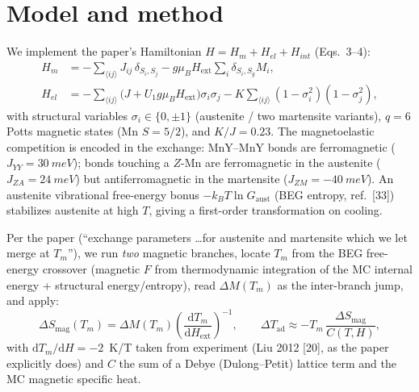 \documentclass[11pt]{article}
\begin{document}
\section{Model and method}
We implement the paper's Hamiltonian $H = H_m + H_{el} + H_{int}$ (Eqs.~3--4):
\begin{align}
H_m &= -\sum_{\langle ij\rangle} J_{ij}\,\delta_{S_i,S_j}
       - g\mu_B H_{\mathrm{ext}}\sum_i \delta_{S_i,S_g} M_i, \\
H_{el} &= -\sum_{\langle ij\rangle}\!\big(J + U_1 g\mu_B H_{\mathrm{ext}}\big)\sigma_i\sigma_j
          - K\!\sum_{\langle ij\rangle}(1-\sigma_i^2)(1-\sigma_j^2),
\end{align}
with structural variables $\sigma_i \in \{0,\pm1\}$ (austenite / two martensite
variants), $q{=}6$ Potts magnetic states (Mn $S{=}5/2$), and $K/J = 0.23$.
The magnetoelastic competition is encoded in the exchange: MnY--MnY bonds are
ferromagnetic ($J_{YY}=\SI{30}{meV}$); bonds touching a $Z$-Mn are ferromagnetic
in the austenite ($J_{ZA}=\SI{24}{meV}$) but antiferromagnetic in the martensite
($J_{ZM}=\SI{-40}{meV}$). An austenite vibrational free-energy bonus
$-k_BT\ln G_{\mathrm{aust}}$ (BEG entropy, ref.~[33]) stabilizes austenite at high
$T$, giving a first-order transformation on cooling.

Per the paper (``exchange parameters \dots for austenite and martensite which we
let merge at $T_m$''), we run \emph{two} magnetic branches, locate $T_m$ from the
BEG free-energy crossover (magnetic $F$ from thermodynamic integration of the MC
internal energy + structural energy/entropy), read $\Delta M(T_m)$ as the
inter-branch jump, and apply:
\begin{equation}
\Delta S_{\mathrm{mag}}(T_m) = \Delta M(T_m)\left(\frac{\mathrm{d}T_m}{\mathrm{d}H_{\mathrm{ext}}}\right)^{-1},
\qquad
\Delta T_{\mathrm{ad}} \approx -T_m\,\frac{\Delta S_{\mathrm{mag}}}{C(T,H)} ,
\end{equation}
with $\mathrm{d}T_m/\mathrm{d}H = -2$~K/T taken from experiment (Liu 2012 [20], as
the paper explicitly does) and $C$ the sum of a Debye (Dulong--Petit) lattice term
and the MC magnetic specific heat.
\end{document}
